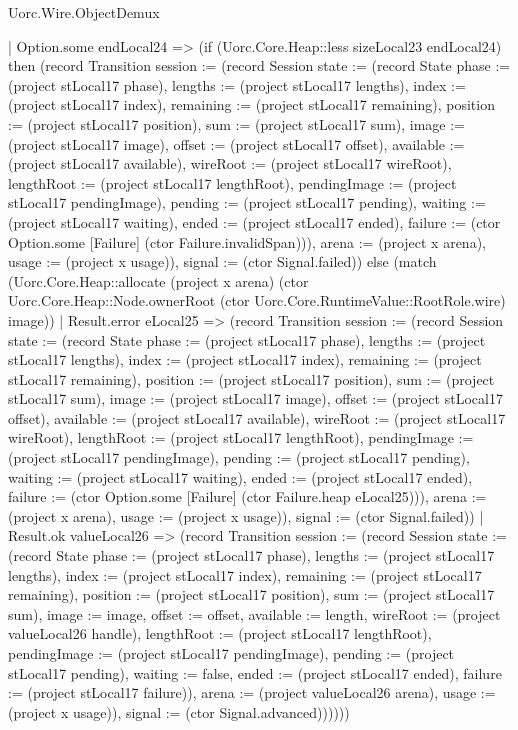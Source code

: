 \begin{lexlean}{Uorc.Wire.ObjectDemux}
\begin{semanticmodule}
{            | Option.some endLocal24 => (if (Uorc.Core.Heap::less sizeLocal23 endLocal24) then (record Transition {session := (record Session {state := (record State {phase := (project stLocal17 phase), lengths := (project stLocal17 lengths), index := (project stLocal17 index), remaining := (project stLocal17 remaining), position := (project stLocal17 position), sum := (project stLocal17 sum), image := (project stLocal17 image), offset := (project stLocal17 offset), available := (project stLocal17 available), wireRoot := (project stLocal17 wireRoot), lengthRoot := (project stLocal17 lengthRoot), pendingImage := (project stLocal17 pendingImage), pending := (project stLocal17 pending), waiting := (project stLocal17 waiting), ended := (project stLocal17 ended), failure := (ctor Option.some [Failure] (ctor Failure.invalidSpan))}), arena := (project x arena), usage := (project x usage)}), signal := (ctor Signal.failed)}) else (match (Uorc.Core.Heap::allocate (project x arena) (ctor Uorc.Core.Heap::Node.ownerRoot (ctor Uorc.Core.RuntimeValue::RootRole.wire) image))
              | Result.error eLocal25 => (record Transition {session := (record Session {state := (record State {phase := (project stLocal17 phase), lengths := (project stLocal17 lengths), index := (project stLocal17 index), remaining := (project stLocal17 remaining), position := (project stLocal17 position), sum := (project stLocal17 sum), image := (project stLocal17 image), offset := (project stLocal17 offset), available := (project stLocal17 available), wireRoot := (project stLocal17 wireRoot), lengthRoot := (project stLocal17 lengthRoot), pendingImage := (project stLocal17 pendingImage), pending := (project stLocal17 pending), waiting := (project stLocal17 waiting), ended := (project stLocal17 ended), failure := (ctor Option.some [Failure] (ctor Failure.heap eLocal25))}), arena := (project x arena), usage := (project x usage)}), signal := (ctor Signal.failed)})
              | Result.ok valueLocal26 => (record Transition {session := (record Session {state := (record State {phase := (project stLocal17 phase), lengths := (project stLocal17 lengths), index := (project stLocal17 index), remaining := (project stLocal17 remaining), position := (project stLocal17 position), sum := (project stLocal17 sum), image := image, offset := offset, available := length, wireRoot := (project valueLocal26 handle), lengthRoot := (project stLocal17 lengthRoot), pendingImage := (project stLocal17 pendingImage), pending := (project stLocal17 pending), waiting := false, ended := (project stLocal17 ended), failure := (project stLocal17 failure)}), arena := (project valueLocal26 arena), usage := (project x usage)}), signal := (ctor Signal.advanced)})))))
}
\end{semanticmodule}
\end{lexlean}
